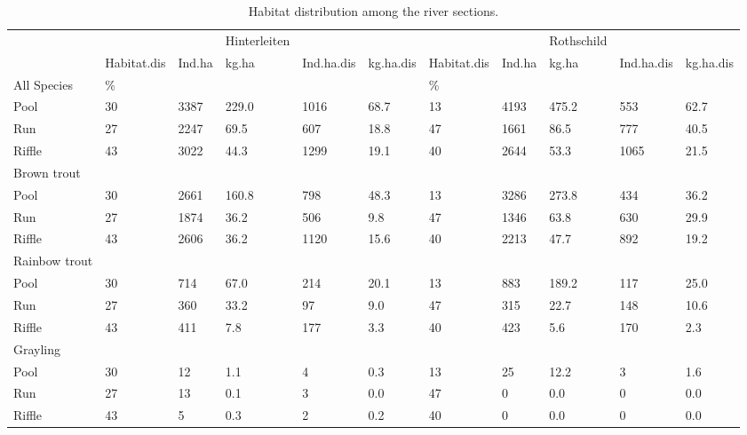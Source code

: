 \begin{table}[!htb]                                 %
	\small                   
	\centering
	\caption{Habitat distribution among the river sections.}
	\begin{tabular}{lllllllllll}
		\toprule
		 &  &  & Hinterleiten &  &  &  &  & Rothschild &  &  \\
		 & Habitat.dis & Ind.ha & kg.ha & Ind.ha.dis & kg.ha.dis & Habitat.dis & Ind.ha & kg.ha & Ind.ha.dis & kg.ha.dis \\
		 \hline
		 \hline
		All Species & \% &  &  &  &  & \% &  &  &  &  \\
		Pool & 30 & 3387 & 229.0 & 1016 & 68.7 & 13 & 4193 & 475.2 & 553 & 62.7 \\
		Run & 27 & 2247 & 69.5 & 607 & 18.8 & 47 & 1661 & 86.5 & 777 & 40.5 \\
		Riffle & 43 & 3022 & 44.3 & 1299 & 19.1 & 40 & 2644 & 53.3 & 1065 & 21.5 \\
		Brown trout &  &  &  &  &  &  &  &  &  &  \\
		Pool & 30 & 2661 & 160.8 & 798 & 48.3 & 13 & 3286 & 273.8 & 434 & 36.2 \\
		Run & 27 & 1874 & 36.2 & 506 & 9.8 & 47 & 1346 & 63.8 & 630 & 29.9 \\
		Riffle & 43 & 2606 & 36.2 & 1120 & 15.6 & 40 & 2213 & 47.7 & 892 & 19.2 \\
		Rainbow trout &  &  &  &  &  &  &  &  &  &  \\
		Pool & 30 & 714 & 67.0 & 214 & 20.1 & 13 & 883 & 189.2 & 117 & 25.0 \\
		Run & 27 & 360 & 33.2 & 97 & 9.0 & 47 & 315 & 22.7 & 148 & 10.6 \\
		Riffle & 43 & 411 & 7.8 & 177 & 3.3 & 40 & 423 & 5.6 & 170 & 2.3 \\
		Grayling &  &  &  &  &  &  &  &  &  &  \\
		Pool & 30 & 12 & 1.1 & 4 & 0.3 & 13 & 25 & 12.2 & 3 & 1.6 \\
		Run & 27 & 13 & 0.1 & 3 & 0.0 & 47 & 0 & 0.0 & 0 & 0.0 \\
		Riffle & 43 & 5 & 0.3 & 2 & 0.2 & 40 & 0 & 0.0 & 0 & 0.0 \\
		\bottomrule
	\end{tabular}
\end{table}

